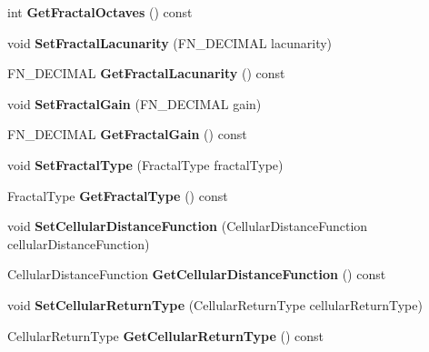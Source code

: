 \begin{DoxyCompactItemize}
int {\bfseries Get\+Fractal\+Octaves} () const
\item 
\mbox{\label{classFastNoise_a2e5e8651bc949144ade310c748518fc2}} 
void {\bfseries Set\+Fractal\+Lacunarity} (F\+N\+\_\+\+D\+E\+C\+I\+M\+AL lacunarity)
\item 
\mbox{\label{classFastNoise_a19d233571cf78b15e19197c4b28c384c}} 
F\+N\+\_\+\+D\+E\+C\+I\+M\+AL {\bfseries Get\+Fractal\+Lacunarity} () const
\item 
\mbox{\label{classFastNoise_abbd1dd9839957f18f5eaf8b2b61610ac}} 
void {\bfseries Set\+Fractal\+Gain} (F\+N\+\_\+\+D\+E\+C\+I\+M\+AL gain)
\item 
\mbox{\label{classFastNoise_a6f3583a9cca358b3490b0d4bfee6a894}} 
F\+N\+\_\+\+D\+E\+C\+I\+M\+AL {\bfseries Get\+Fractal\+Gain} () const
\item 
\mbox{\label{classFastNoise_ad5ebb22802d87f7eb425a711658e47d8}} 
void {\bfseries Set\+Fractal\+Type} (Fractal\+Type fractal\+Type)
\item 
\mbox{\label{classFastNoise_ad65fd4033ae2177be857fc186e9d6315}} 
Fractal\+Type {\bfseries Get\+Fractal\+Type} () const
\item 
\mbox{\label{classFastNoise_aa47dea942e8c687892b5bad6d652883f}} 
void {\bfseries Set\+Cellular\+Distance\+Function} (Cellular\+Distance\+Function cellular\+Distance\+Function)
\item 
\mbox{\label{classFastNoise_a16af57f7010f7770d3b866619d89599c}} 
Cellular\+Distance\+Function {\bfseries Get\+Cellular\+Distance\+Function} () const
\item 
\mbox{\label{classFastNoise_ac643a011759d70ed71651774f53f1c65}} 
void {\bfseries Set\+Cellular\+Return\+Type} (Cellular\+Return\+Type cellular\+Return\+Type)
\item 
\mbox{\label{classFastNoise_a6336a4871db63d0f30d01d784412574e}} 
Cellular\+Return\+Type {\bfseries Get\+Cellular\+Return\+Type} () const
\item 

\end{DoxyCompactItemize}
